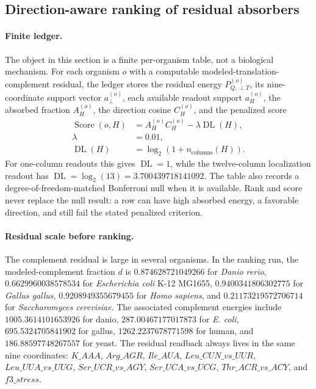 \subsection{Direction-aware ranking of residual absorbers}
\label{sec:q6-h-ranking-direction-aware}

\paragraph{Finite ledger.}
The object in this section is a finite per-organism table, not a biological mechanism.  For each organism $o$ with a computable modeled-translation-complement residual, the ledger stores the residual energy $P_{Q,\perp T}^{(o)}$, its nine-coordinate support vector $a_{\perp}^{(o)}$, each available readout support $a_H^{(o)}$, the absorbed fraction $A_H^{(o)}$, the direction cosine $C_H^{(o)}$, and the penalized score
$$
\begin{aligned}
\operatorname{Score}(o,H) &= A_H^{(o)} C_H^{(o)} - \lambda \operatorname{DL}(H),\\
\lambda &= 0.01,\\
\operatorname{DL}(H) &= \log_2(1+n_{\mathrm{columns}}(H)).
\end{aligned}
$$
For one-column readouts this gives $\operatorname{DL}=1$, while the twelve-column localization readout has $\operatorname{DL}=\log_2(13)=3.700439718141092$.  The table also records a degree-of-freedom-matched Bonferroni null when it is available.  Rank and score never replace the null result: a row can have high absorbed energy, a favorable direction, and still fail the stated penalized criterion.

\paragraph{Residual scale before ranking.}
The complement residual is large in several organisms.  In the ranking run, the modeled-complement fraction $d$ is $0.874628721049266$ for \emph{Danio rerio}, $0.6629960038578534$ for \emph{Escherichia coli} K-12 MG1655, $0.9400341806302775$ for \emph{Gallus gallus}, $0.9208949355679455$ for \emph{Homo sapiens}, and $0.21173219572706714$ for \emph{Saccharomyces cerevisiae}.  The associated complement energies include $1005.3614101653926$ for danio, $287.00467177017873$ for \emph{E. coli}, $695.5324705841902$ for gallus, $1262.2237678771598$ for human, and $186.88597748267557$ for yeast.  The residual readback always lives in the same nine coordinates: $K\_AAA$, $Arg\_AGR$, $Ile\_AUA$, $Leu\_CUN\_vs\_UUR$, $Leu\_UUA\_vs\_UUG$, $Ser\_UCR\_vs\_AGY$, $Ser\_UCA\_vs\_UCG$, $Thr\_ACR\_vs\_ACY$, and $f3\_stress$.

